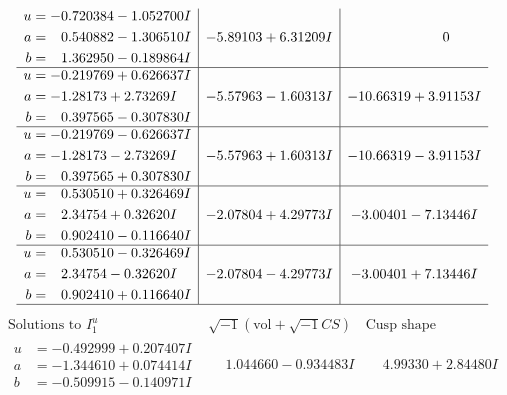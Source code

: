 \documentclass[1p]{elsarticle_modified}
\theoremstyle{definition}
\newcommand{\I}{\sqrt{-1}}
\begin{document}
$$\begin{array}{c|c|c}
\begin{aligned}
u &= -0.720384 - 1.052700 I \\
a &= \phantom{-}0.540882 - 1.306510 I \\
b &= \phantom{-}1.362950 - 0.189864 I\end{aligned}
 & -5.89103 + 6.31209 I & \phantom{-0.000000 } 0 \\ \hline\begin{aligned}
u &= -0.219769 + 0.626637 I \\
a &= -1.28173 + 2.73269 I \\
b &= \phantom{-}0.397565 - 0.307830 I\end{aligned}
 & -5.57963 - 1.60313 I & -10.66319 + 3.91153 I \\ \hline\begin{aligned}
u &= -0.219769 - 0.626637 I \\
a &= -1.28173 - 2.73269 I \\
b &= \phantom{-}0.397565 + 0.307830 I\end{aligned}
 & -5.57963 + 1.60313 I & -10.66319 - 3.91153 I \\ \hline\begin{aligned}
u &= \phantom{-}0.530510 + 0.326469 I \\
a &= \phantom{-}2.34754 + 0.32620 I \\
b &= \phantom{-}0.902410 - 0.116640 I\end{aligned}
 & -2.07804 + 4.29773 I & -3.00401 - 7.13446 I \\ \hline\begin{aligned}
u &= \phantom{-}0.530510 - 0.326469 I \\
a &= \phantom{-}2.34754 - 0.32620 I \\
b &= \phantom{-}0.902410 + 0.116640 I\end{aligned}
 & -2.07804 - 4.29773 I & -3.00401 + 7.13446 I\\
 \hline 
 \end{array}$$\newpage$$\begin{array}{c|c|c}  
\text{Solutions to }I^u_{1}& \I (\text{vol} + \sqrt{-1}CS) & \text{Cusp shape}\\
 \hline 
\begin{aligned}
u &= -0.492999 + 0.207407 I \\
a &= -1.344610 + 0.074414 I \\
b &= -0.509915 - 0.140971 I\end{aligned}
 & \phantom{-}1.044660 - 0.934483 I & \phantom{-}4.99330 + 2.84480 I \\ \hline\begin{aligned}

\end{aligned}
\end{array}$$
\end{document}

